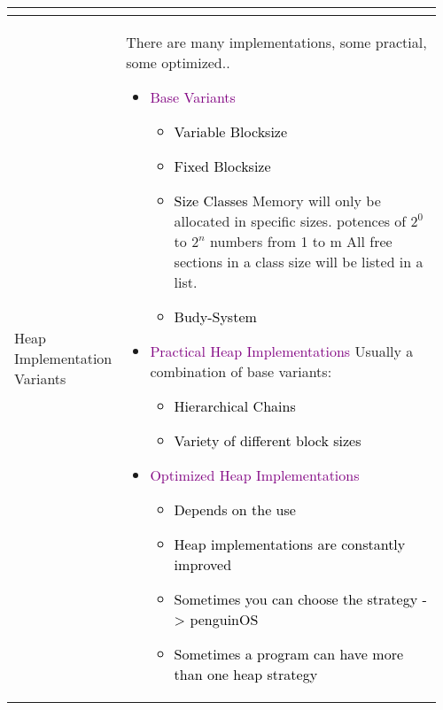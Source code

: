 \documentclass[main.tex,fontsize=8pt,paper=a4,paper=portrait,DIV=calc,]{scrartcl}
\begin{document}
\begin{table}[ht!]
\begin{tabular}{|m{0.2\linewidth}|m{0.755\linewidth}|}
\begin{itemize}
\vspace{-3mm}
\end{itemize} 
\\
\hline
Heap Implementation Variants & 
There are many implementations, some practial, some optimized..\newline
\begin{itemize}
\item \textcolor{purple}{Base Variants}\newline
  \begin{itemize}
  \item \textcolor{black}{Variable Blocksize}
  \item \textcolor{black}{Fixed Blocksize}
  \item \textcolor{black}{Size Classes}
    Memory will only be allocated in specific sizes.\newline
    potences of \(2^0\) to \(2^n\)\newline
    numbers from 1 to m\newline
    All free sections in a class size will be listed in a list.
  \item \textcolor{black}{Budy-System}
  \end{itemize} 
\item \textcolor{purple}{Practical Heap Implementations}\newline
  Usually a combination of base variants:\newline
  \begin{itemize}
  \item \textcolor{black}{Hierarchical Chains}
  \item \textcolor{black}{Variety of different block sizes}
  \end{itemize} 
\item \textcolor{purple}{Optimized Heap Implementations}\newline
  \begin{itemize}
  \item \textcolor{black}{Depends on the use}
  \item \textcolor{black}{Heap implementations are constantly improved}
  \item \textcolor{black}{Sometimes you can choose the strategy -> penguinOS}
  \item \textcolor{black}{Sometimes a program can have more than one heap strategy}
  \end{itemize} 
\vspace{-3mm}
\end{itemize}\\ 

\end{tabular}
\end{table}
\end{document}
